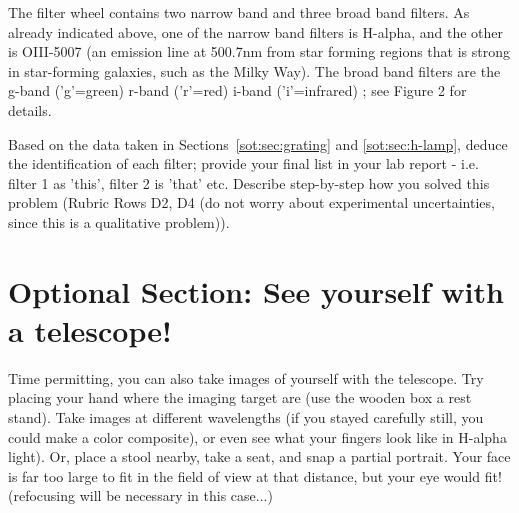 The filter wheel contains two narrow band and three broad band filters. As already indicated
above, one of the narrow band filters is H-alpha, and the other is OIII-5007 (an emission line
at 500.7nm from star forming regions that is strong in star-forming galaxies, such as the Milky
Way). The broad band filters are the g-band (’g’=green) r-band (’r’=red) i-band (’i’=infrared) ;
see Figure 2 for details.

Based on the data taken in Sections~\ref{sot:sec:grating} and \ref{sot:sec:h-lamp}, deduce the identification of
each filter; provide your final list in your lab report - i.e. filter 1 as ’this’, filter 2 is ’that’ etc. Describe step-by-step how you solved this problem (Rubric Rows D2, D4 (do not worry about experimental uncertainties, since this is a qualitative problem)).

\section{Optional Section: See yourself with a telescope!}

Time permitting, you can also take images of yourself with the telescope.
Try placing your hand where the imaging target are (use the wooden box a
rest stand). Take images at different wavelengths (if you stayed carefully
still, you could make a color composite), or even see what your fingers
look like in H-alpha light). Or, place a stool nearby, take a seat, and
snap a partial portrait. Your face is far too large to fit in the field of
view at that distance, but your eye would fit! (refocusing will be
necessary in this case...)